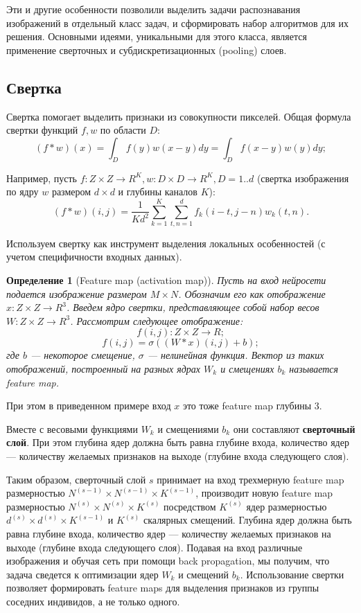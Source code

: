 \documentclass[12pt, specialist, subf, substylefile = spbu.rtx]{disser}
\newtheorem{definition}{Определение}
\begin{document}
Эти и другие особенности позволили выделить задачи распознавания изображений в отдельный класс задач, и сформировать набор алгоритмов для их решения. Основными идеями, уникальными для этого класса, является применение сверточных и субдискретизационных (pooling) слоев.

\subsection{Свертка}

Свертка помогает выделить признаки из совокупности пикселей. Общая формула свертки функций $f, w$ по области $D$:
$$
(f*w)(x)=\int_D f(y)w(x-y)dy=\int_D f(x-y)w(y)dy;
$$

Например, пусть $f:Z \times Z \to R^K, w: D \times D \to R^K, D = 1..d$ (свертка изображения по ядру $w$ размером $d \times d$ и глубины каналов $K$):
$$
(f*w)(i,j)=\frac{1}{Kd^2}\sum_{k=1}^K \sum_{t,n=1}^d f_k(i-t, j-n) w_k(t,n).
$$

Используем свертку как инструмент выделения локальных особенностей (с учетом специфичности входных данных).

\begin{definition}[Feature map (activation map)]
Пусть на вход нейросети подается изображение размером $M \times N$. Обозначим его как отображение $x: Z \times Z \to R^3$.
Введем ядро свертки, представляющее собой набор весов $W: Z \times Z \to R^3$. Рассмотрим следующее отображение:
$$
f(i, j): Z \times Z \to R;
$$
$$
f(i, j) = \sigma((W*x)(i, j) + b);
$$
где $b$ --- некоторое смещение, $\sigma$ --- нелинейная функция. Вектор из таких отображений, построенный на разных ядрах $W_k$ и смещениях $b_k$ называется feature map.
\end{definition}
При этом в приведенном примере вход $x$ это тоже feature map глубины 3.

Вместе с весовыми функциями $W_k$ и смещениями $b_k$ они составляют \textbf{сверточный слой}. При этом глубина ядер должна быть равна глубине входа, количество ядер --- количеству желаемых признаков на выходе (глубине входа следующего слоя).

Таким образом, сверточный слой $s$ принимает на вход трехмерную feature map размерностью $N^{(s-1)} \times N^{(s-1)} \times K^{(s-1)}$, производит новую feature map размерностью $N^{(s)} \times N^{(s)} \times K^{(s)}$ посредством $K^{(s)}$ ядер размерностью $d^{(s)} \times d^{(s)} \times K^{(s-1)}$ и $K^{(s)}$ скалярных смещений. Глубина ядер должна быть равна глубине входа, количество ядер --- количеству желаемых признаков на выходе (глубине входа следующего слоя). Подавая на вход различные изображения и обучая сеть при помощи back propagation, мы получим, что задача сведется к оптимизации ядер $W_k$ и смещений $b_k$. Использование свертки позволяет формировать feature maps для выделения признаков из группы соседних индивидов, а не только одного.
\end{document}
